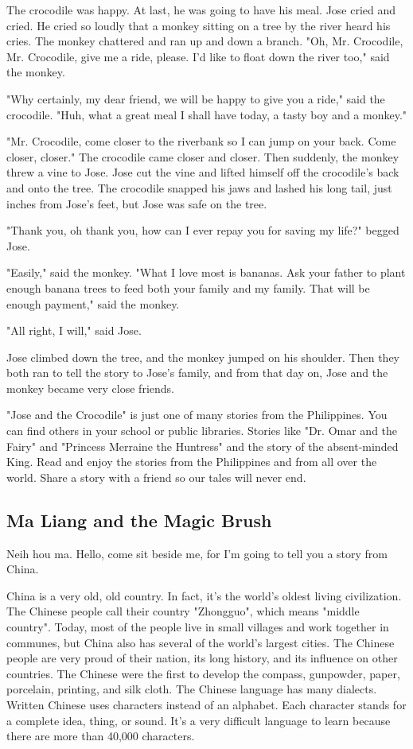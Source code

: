 The crocodile was happy. At last, he was going to have his meal. Jose cried and cried. He cried so loudly that a monkey sitting on a tree by the river heard his cries. The monkey chattered and ran up and down a branch. "Oh, Mr. Crocodile, Mr. Crocodile, give me a ride, please. I'd like to float down the river too," said the monkey.

"Why certainly, my dear friend, we will be happy to give you a ride," said the crocodile. "Huh, what a great meal I shall have today, a tasty boy and a monkey."

"Mr. Crocodile, come closer to the riverbank so I can jump on your back. Come closer, closer." The crocodile came closer and closer. Then suddenly, the monkey threw a vine to Jose. Jose cut the vine and lifted himself off the crocodile's back and onto the tree. The crocodile snapped his jaws and lashed his long tail, just inches from Jose's feet, but Jose was safe on the tree.

"Thank you, oh thank you, how can I ever repay you for saving my life?" begged Jose.

"Easily," said the monkey. "What I love most is bananas. Ask your father to plant enough banana trees to feed both your family and my family. That will be enough payment," said the monkey.

"All right, I will," said Jose.

Jose climbed down the tree, and the monkey jumped on his shoulder. Then they both ran to tell the story to Jose's family, and from that day on, Jose and the monkey became very close friends.

"Jose and the Crocodile" is just one of many stories from the Philippines. You can find others in your school or public libraries. Stories like "Dr. Omar and the Fairy" and "Princess Merraine the Huntress" and the story of the absent-minded King. Read and enjoy the stories from the Philippines and from all over the world. Share a story with a friend so our tales will never end.


\subsection{Ma Liang and the Magic Brush}

Neih hou ma. Hello, come sit beside me, for I'm going to tell you a story from China.

China is a very old, old country. In fact, it's the world's oldest living civilization. The Chinese people call their country "Zhongguo", which means "middle country". Today, most of the people live in small villages and work together in communes, but China also has several of the world's largest cities. The Chinese people are very proud of their nation, its long history, and its influence on other countries. The Chinese were the first to develop the compass, gunpowder, paper, porcelain, printing, and silk cloth. The Chinese language has many dialects. Written Chinese uses characters instead of an alphabet. Each character stands for a complete idea, thing, or sound. It's a very difficult language to learn because there are more than 40,000 characters.

